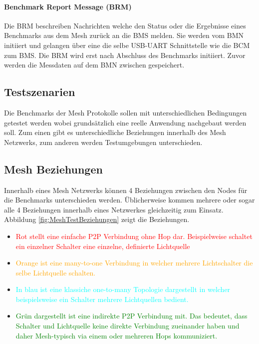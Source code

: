 \paragraph{Benchmark Report Message (BRM)}
Die BRM beschreiben Nachrichten welche den Status oder die Ergebnisse eines Benchmarks aus dem Mesh zurück an die BMS melden. Sie werden vom BMN initiiert und gelangen über eine die selbe USB-UART Schnittstelle wie die BCM zum BMS. Die BRM wird erst nach Abschluss des Benchmarks initiiert. Zuvor werden die Messdaten auf dem BMN zwischen gespeichert.



\subsection{Testszenarien}\label{subsec:TestszenarienMesh}

Die Benchmarks der Mesh Protokolle sollen mit unterschiedlichen Bedingungen getestet werden wobei grundsätzlich eine reelle Anwendung nachgebaut werden soll. Zum einen gibt es unterschiedliche Beziehungen innerhalb des Mesh Netzwerks, zum anderen werden Testumgebungen unterschieden.

\subsection{Mesh Beziehungen}\label{subsec:MeshBeziehungen}

Innerhalb eines Mesh Netzwerks können 4 Beziehungen zwischen den Nodes für die Benchmarks unterschieden werden. Üblicherweise kommen mehrere oder sogar alle 4 Beziehungen innerhalb eines Netzwerkes gleichzeitig zum Einsatz. Abbildung \ref{fig:MeshTestBeziehungen} zeigt die Beziehungen.

\begin{itemize}
 	\item \textcolor{red}{Rot stellt eine einfache P2P Verbindung ohne Hop dar. Beispielweise schaltet ein einzelner Schalter eine einzelne, definierte Lichtquelle}
 	\item \textcolor{orange}{Orange ist eine many-to-one Verbindung in welcher mehrere Lichtschalter die selbe Lichtquelle schalten.}
 	\item \textcolor{cyan}{In blau ist eine klassiche one-to-many Topologie dargestellt in welcher beispielsweise ein Schalter mehrere Lichtquellen bedient.}
 	 \item \textcolor{green}{Grün dargestellt ist eine indirekte P2P Verbindung mit. Das bedeutet, dass Schalter und Lichtquelle keine direkte Verbindung zueinander haben und daher Mesh-typisch via einem oder mehreren Hops kommuniziert.}
\end{itemize}


